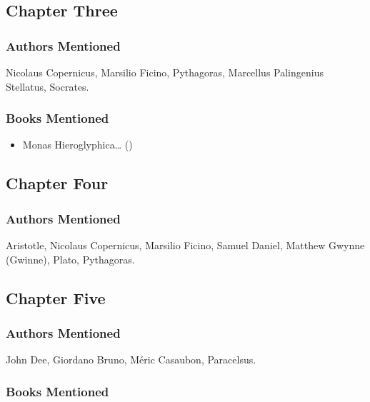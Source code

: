 \documentclass[
]{article}
\providecommand{\tightlist}{%
  \setlength{\itemsep}{0pt}\setlength{\parskip}{0pt}}
\begin{document}
\subsection{Chapter Three}\label{chapter-three-1}

\subsubsection{Authors Mentioned}\label{authors-mentioned-7}

Nicolaus Copernicus, Marsilio Ficino, Pythagoras, Marcellus Palingenius
Stellatus, Socrates.

\subsubsection{Books Mentioned}\label{books-mentioned-9}

\begin{itemize}
\tightlist
\item
  Monas Hieroglyphica\ldots{} ()
\end{itemize}

\subsection{Chapter Four}\label{chapter-four-1}

\subsubsection{Authors Mentioned}\label{authors-mentioned-8}

Aristotle, Nicolaus Copernicus, Marsilio Ficino, Samuel Daniel, Matthew
Gwynne (Gwinne), Plato, Pythagoras.

\subsection{Chapter Five}\label{chapter-five-1}

\subsubsection{Authors Mentioned}\label{authors-mentioned-9}

John Dee, Giordano Bruno, Méric Casaubon, Paracelsus.

\subsubsection{Books Mentioned}\label{books-mentioned-10}
\end{document}

